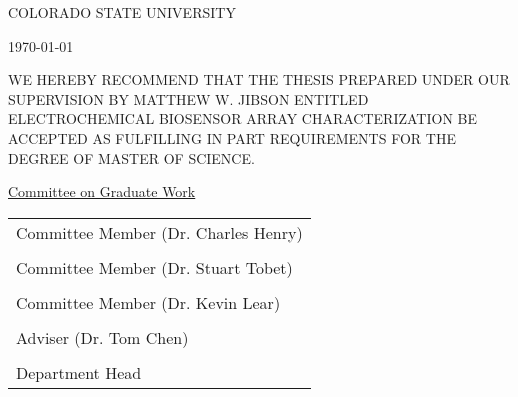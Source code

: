 \begin{center}
	COLORADO STATE UNIVERSITY
\end{center}

\vspace{0.5in}

\begin{flushright}
	\today
\end{flushright}

WE HEREBY RECOMMEND THAT THE THESIS PREPARED UNDER OUR SUPERVISION BY MATTHEW W. JIBSON ENTITLED ELECTROCHEMICAL BIOSENSOR ARRAY CHARACTERIZATION BE ACCEPTED AS FULFILLING IN PART REQUIREMENTS FOR THE DEGREE OF MASTER OF SCIENCE.

\vspace{0.5in}

\begin{center}
	\underline{Committee on Graduate Work}\\

	\vspace{0.5in}

	\begin{tabular}{p{3in}}
		\\
		\hline Committee Member (Dr. Charles Henry)\\
		\\
		\hline Committee Member (Dr. Stuart Tobet)\\
		\\
		\hline Committee Member (Dr. Kevin Lear)\\
		\\
		\hline Adviser (Dr. Tom Chen)\\
		\\
		\hline Department Head
	\end{tabular}
\end{center}
